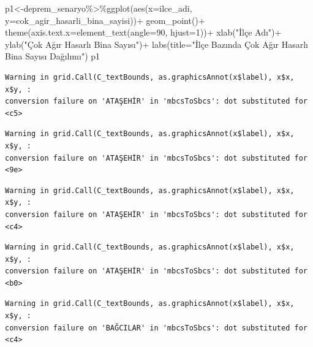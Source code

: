 \documentclass[
  11pt,
  a4paper,
  DIV=11,
  numbers=noendperiod]{scrartcl}
\newenvironment{Shaded}{\begin{snugshade}}{\end{snugshade}}
\newcommand{\AttributeTok}[1]{\textcolor[rgb]{0.40,0.45,0.13}{#1}}
\newcommand{\DecValTok}[1]{\textcolor[rgb]{0.68,0.00,0.00}{#1}}
\newcommand{\FunctionTok}[1]{\textcolor[rgb]{0.28,0.35,0.67}{#1}}
\newcommand{\NormalTok}[1]{\textcolor[rgb]{0.00,0.23,0.31}{#1}}
\newcommand{\OtherTok}[1]{\textcolor[rgb]{0.00,0.23,0.31}{#1}}
\newcommand{\SpecialCharTok}[1]{\textcolor[rgb]{0.37,0.37,0.37}{#1}}
\newcommand{\StringTok}[1]{\textcolor[rgb]{0.13,0.47,0.30}{#1}}
\begin{document}
\begin{Shaded}
\begin{Highlighting}[]
\NormalTok{p1}\OtherTok{\textless{}{-}}\NormalTok{deprem\_senaryo}\SpecialCharTok{\%\textgreater{}\%}\FunctionTok{ggplot}\NormalTok{(}\FunctionTok{aes}\NormalTok{(}\AttributeTok{x=}\NormalTok{ilce\_adi, }\AttributeTok{y=}\NormalTok{cok\_agir\_hasarli\_bina\_sayisi))}\SpecialCharTok{+}
  \FunctionTok{geom\_point}\NormalTok{()}\SpecialCharTok{+}
  \FunctionTok{theme}\NormalTok{(}\AttributeTok{axis.text.x=}\FunctionTok{element\_text}\NormalTok{(}\AttributeTok{angle=}\DecValTok{90}\NormalTok{, }\AttributeTok{hjust=}\DecValTok{1}\NormalTok{))}\SpecialCharTok{+}
  \FunctionTok{xlab}\NormalTok{(}\StringTok{"İlçe Adı"}\NormalTok{)}\SpecialCharTok{+}
  \FunctionTok{ylab}\NormalTok{(}\StringTok{"Çok Ağır Hasarlı Bina Sayısı"}\NormalTok{)}\SpecialCharTok{+}
  \FunctionTok{labs}\NormalTok{(}\AttributeTok{title=}\StringTok{"İlçe Bazında Çok Ağır Hasarlı Bina Sayısı Dağılımı"}\NormalTok{)}
\NormalTok{p1}
\end{Highlighting}
\end{Shaded}

\begin{verbatim}
Warning in grid.Call(C_textBounds, as.graphicsAnnot(x$label), x$x, x$y, :
conversion failure on 'ATAŞEHİR' in 'mbcsToSbcs': dot substituted for <c5>
\end{verbatim}

\begin{verbatim}
Warning in grid.Call(C_textBounds, as.graphicsAnnot(x$label), x$x, x$y, :
conversion failure on 'ATAŞEHİR' in 'mbcsToSbcs': dot substituted for <9e>
\end{verbatim}

\begin{verbatim}
Warning in grid.Call(C_textBounds, as.graphicsAnnot(x$label), x$x, x$y, :
conversion failure on 'ATAŞEHİR' in 'mbcsToSbcs': dot substituted for <c4>
\end{verbatim}

\begin{verbatim}
Warning in grid.Call(C_textBounds, as.graphicsAnnot(x$label), x$x, x$y, :
conversion failure on 'ATAŞEHİR' in 'mbcsToSbcs': dot substituted for <b0>
\end{verbatim}

\begin{verbatim}
Warning in grid.Call(C_textBounds, as.graphicsAnnot(x$label), x$x, x$y, :
conversion failure on 'BAĞCILAR' in 'mbcsToSbcs': dot substituted for <c4>
\end{verbatim}
\end{document}
